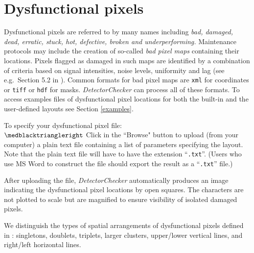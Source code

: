 \documentclass[11pt,a4paper]{article}
\newcommand{\DetectorChecker}{\emph{DetectorChecker}\xspace}
\begin{document}
\section{Dysfunctional pixels}\label{dysfct}

Dysfunctional pixels are referred to by many names including \emph{bad, damaged, dead, erratic, stuck, hot, defective, broken and underperforming.} Maintenance protocols may include the creation of so-called \emph{bad pixel maps} containing their locations. Pixels flagged as damaged in such maps are identified by a combination of criteria based on signal intensities, noise levels, uniformity and lag (see e.g.~Section 5.2 in \cite{manualXRD1621}). 
Common formats for bad pixel maps are \texttt{xml} for coordinates or \texttt{tiff} or \texttt{hdf} for masks. 
\DetectorChecker can process all of these formats. To access examples files of dysfunctional pixel locations for both the built-in and the user-defined layouts see Section \ref{examples}.

To specify your dysfunctional pixel file:
\\
$\medblacktriangleright$ Click in the ``Browse" button 
to upload (from your computer) a plain text file containing a list of parameters specifying the layout. Note that the plain text file will have to have the extension ``\texttt{.txt}''. (Users who use MS Word to construct the file should export the result as a ``\texttt{.txt}'' file.) 

After uploading the file, \DetectorChecker automatically produces an image indicating the dysfunctional pixel locations 
by open squares. The characters are not plotted to scale but are magnified to ensure visibility of isolated damaged pixels.

We distinguish the types of spatial arrangements of dysfunctional pixels defined in \cite{brettschneider2014crism}:
singletons, doublets, triplets, larger clusters, upper/lower vertical lines, and right/left horizontal lines.
\end{document}

